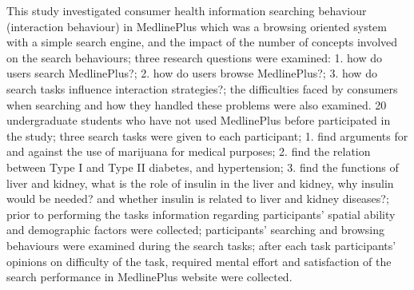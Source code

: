 \documentclass[]{article}
\begin{document}
This study investigated consumer health information searching behaviour (interaction behaviour) in MedlinePlus which was a browsing oriented system with a simple search engine, and the impact of the number of concepts involved on the search behaviours; three research  questions were examined: 1. how do users search MedlinePlus?; 2. how do users browse MedlinePlus?; 3. how do search tasks influence interaction strategies?; the difficulties faced by consumers when searching and how they handled these problems were also examined. 20 undergraduate students who have not used MedlinePlus before participated in the study; three search tasks were given to each participant; 1. find arguments for and against the use of marijuana for medical purposes; 2. find the relation between Type I and Type II diabetes, and hypertension; 3. find the functions of liver and kidney, what is the role of insulin in the liver and kidney, why insulin would be needed? and whether insulin is related to liver and kidney diseases?; prior to performing the tasks information regarding participants' spatial ability and demographic factors were collected; participants' searching and browsing behaviours were examined during the search tasks; after each task participants' opinions on difficulty of the task, required mental effort and satisfaction of the search performance in MedlinePlus website were collected.                
\end{document}
